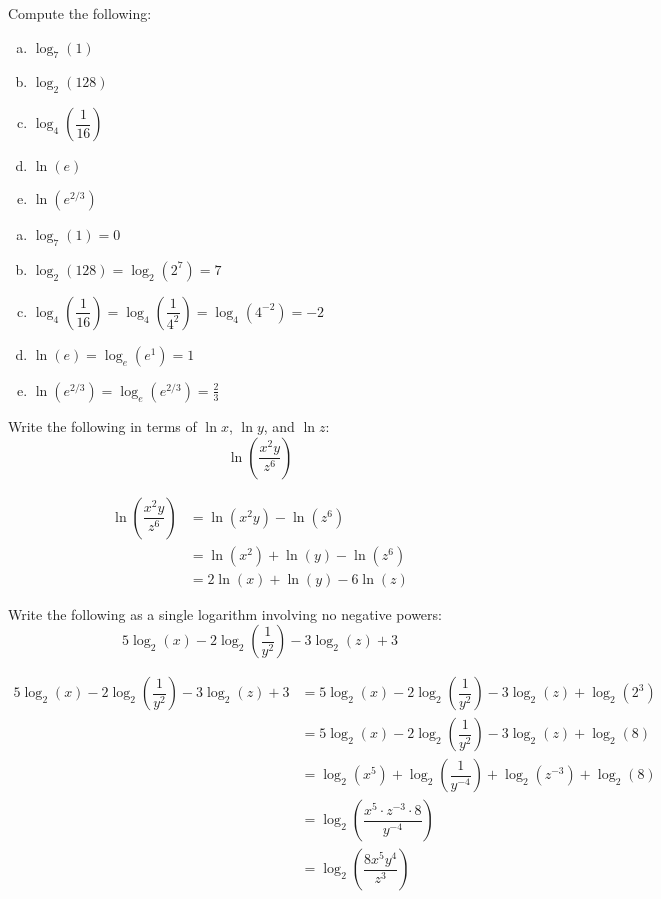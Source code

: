 \documentclass[11pt,letterpaper]{article}
\begin{document}

 Compute the following:
	\begin{enumerate}[(a)]
	\item $\log_7(1)$
	\item $\log_2(128)$
	\item $\log_4 \left( \dfrac{1}{16} \right)$
	\item $\ln(e)$
	\item $\ln(e^{2/3})$
	\end{enumerate} \pspace

\sol
\begin{enumerate}[(a)]
\item $\log_7(1)= 0$ 

\item $\log_2(128)= \log_2(2^7)= 7$

\item $\log_4 \left( \dfrac{1}{16} \right)= \log_4 \left( \dfrac{1}{4^2} \right)= \log_4(4^{-2})= -2$

\item $\ln(e)= \log_e(e^1)= 1$

\item $\ln(e^{2/3})= \log_e(e^{2/3})= \frac{2}{3}$
\end{enumerate}



\newpage



 Write the following in terms of $\ln x$, $\ln y$, and $\ln z$:
	\[
	\ln \left( \dfrac{x^2 y}{z^6} \right)
	\] \pspace

\sol
	\[
	\begin{aligned}
	\ln \left( \dfrac{x^2 y}{z^6} \right)&= \ln(x^2y) - \ln(z^6) \\[0.3cm]
	&= \ln(x^2) + \ln(y) - \ln(z^6) \\[0.3cm]
	&= 2 \ln(x) + \ln(y) - 6 \ln(z) 
	\end{aligned}
	\]



\newpage



 Write the following as a single logarithm involving no negative powers:
	\[
	5\log_2(x) - 2\log_2 \left( \dfrac{1}{y^2} \right) - 3\log_2(z) + 3
	\] \pspace

\sol
	\[
	\begin{aligned}
	5\log_2(x) - 2\log_2 \left( \dfrac{1}{y^2} \right) - 3\log_2(z) + 3&= 5\log_2(x) - 2\log_2 \left( \dfrac{1}{y^2} \right) - 3\log_2(z) + \log_2(2^3) \\[0.3cm]
	&= 5\log_2(x) - 2\log_2 \left( \dfrac{1}{y^2} \right) - 3\log_2(z) + \log_2(8) \\[0.3cm]
	&= \log_2(x^5) + \log_2 \left( \dfrac{1}{y^{-4}} \right) + \log_2(z^{-3}) + \log_2(8) \\[0.3cm]
	&= \log_2 \left( \dfrac{x^5 \cdot z^{-3} \cdot 8}{y^{-4}} \right) \\[0.3cm]
	&= \log_2 \left( \dfrac{8 x^5 y^4}{z^3} \right) 
	\end{aligned}
	\]
\end{document}
